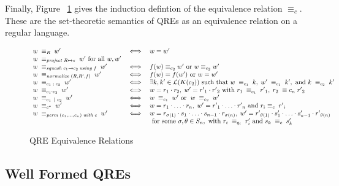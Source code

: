\documentclass[acmsmall,review,anonymous]{acmart}
\newcommand{\kw}[1]{\ensuremath{\mathit{#1}}}
\newcommand{\project}[2]{\ensuremath{\kw{project} \; #1 \mapsto #2}}
\newcommand{\squash}[3]{\ensuremath{\kw{squash} \; #1 \rightarrow #2\; \kw{using} \; #3}}
\newcommand{\perm}[2]{\ensuremath{\kw{perm}\; (#1)\; \kw{with}\; #2}}
\newcommand{\normalize}[3]{\ensuremath{\kw{normalize} \; (#1, #2, #3)}}
\newcommand{\sep}{\ensuremath{\ | \ }}
\newcommand{\eqrel}[1]{\ensuremath{\equiv_{#1}}}
\begin{document}
Finally, Figure ~\ref{fig:relations} gives the induction defintion of the
equivalence relation $\eqrel{c}$. These are the set-theoretic semantics of QREs
as an equivalence relation on a regular language.

\begin{figure}[t]
\centering
\[
\begin{array}{l@{\quad}l@{\quad}l}
w \; \equiv_R \; w' &\iff& w = w' \\
w \; \equiv_{\project{R}{s}} \; w' \text{ for all }w, w'\\
w \; \equiv_{\squash{c_1}{c_2}{f}} \; w' &\iff& f(w) \equiv_{c_2} w'
\text{ or } w \equiv_{c_2} w' \\
w \; \equiv_{\normalize{R}{R'}{f}} \; w' &\iff&
f(w)=f(w') \text{ or }w = w'\\
w \; \equiv_{c_1 \; ; \; c_2} \; w' &\iff& \exists k, k' \in
\mathcal{L}(K(c_2)) \text{ such that } w \; \equiv_{c_1} \; k, \; w' \;
\equiv_{c_1} \; k', \text{ and } k \; \equiv_{c_2} \; k'\\
w \; \equiv_{c_1 \cdot c_2} \; w'  &\iff& w = r_1
\cdot r_2, \; w' = {r'}_1 \cdot {r'}_2 \text{ with } r_1 \; \equiv_{c_1}
\; {r'}_1, \; r_2 \; \equiv{c_n} \; {r'}_2\\
w \; \equiv_{c_1 \sep c_2} \; w' &\iff& w \; \equiv_{c_1} \; w'
\text{ or } \; w \; \equiv_{c_2} \; w'\\
w \; \equiv_{c^*} \; w' &\iff& w = r_1 \cdot \ldots \cdot r_n, \; w'
= {r'}_1 \cdot \ldots \cdot {r'}_n \text{ and } r_i \equiv_{c} \; {r'}_i
\\
w \; \equiv_{\perm{c_1, \ldots, c_n}{c}} \; w' &\iff& w = r_{\sigma(1)}
\cdot s_1 \cdot \ldots \cdot s_{n-1} \cdot r_{\sigma(n)}, \;
w' = {r'}_{\theta(1)} \cdot s'_1 \cdot \ldots \cdot s'_{n-1}
\cdot {r'}_{\theta(n)} \\
& & \text{ for some } \sigma, \theta \in S_n, \text{ with } r_i \;
\equiv_{q_i} \; r'_i \text{ and } s_k \; \equiv_{c} \; s'_{k}
\end{array}
\]
\caption{QRE Equivalence Relations}
\label{fig:relations}
\end{figure}
\subsection{Well Formed QREs}
\end{document}
